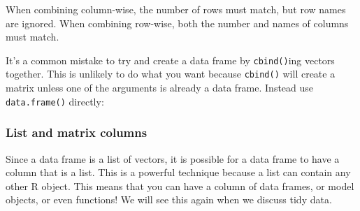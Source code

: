 \documentclass[]{book}
\newenvironment{Shaded}{\begin{snugshade}}{\end{snugshade}}
\newcommand{\KeywordTok}[1]{\textcolor[rgb]{0.13,0.29,0.53}{\textbf{#1}}}
\newcommand{\DataTypeTok}[1]{\textcolor[rgb]{0.13,0.29,0.53}{#1}}
\newcommand{\DecValTok}[1]{\textcolor[rgb]{0.00,0.00,0.81}{#1}}
\newcommand{\StringTok}[1]{\textcolor[rgb]{0.31,0.60,0.02}{#1}}
\newcommand{\CommentTok}[1]{\textcolor[rgb]{0.56,0.35,0.01}{\textit{#1}}}
\newcommand{\OperatorTok}[1]{\textcolor[rgb]{0.81,0.36,0.00}{\textbf{#1}}}
\newcommand{\NormalTok}[1]{#1}
\theoremstyle{definition}
\theoremstyle{definition}
\theoremstyle{definition}
\theoremstyle{remark}
\begin{document}
When combining column-wise, the number of rows must match, but row names
are ignored. When combining row-wise, both the number and names of
columns must match.

It's a common mistake to try and create a data frame by
\texttt{cbind()}ing vectors together. This is unlikely to do what you
want because \texttt{cbind()} will create a matrix unless one of the
arguments is already a data frame. Instead use \texttt{data.frame()}
directly:

\begin{Shaded}
\end{Shaded}

\subsubsection{List and matrix columns}\label{list-and-matrix-columns}

Since a data frame is a list of vectors, it is possible for a data frame
to have a column that is a list. This is a powerful technique because a
list can contain any other R object. This means that you can have a
column of data frames, or model objects, or even functions! We will see
this again when we discuss tidy data.

\begin{Shaded}
\end{Shaded}
\end{document}

